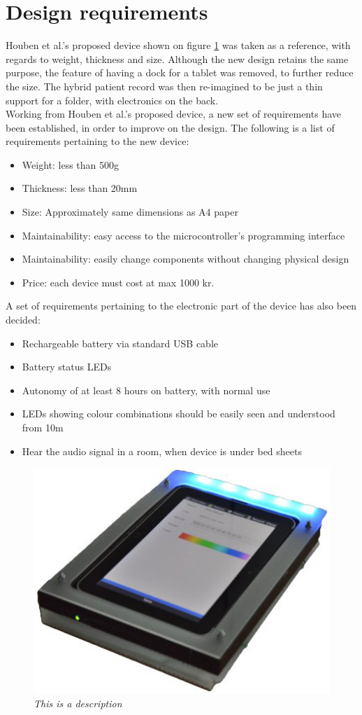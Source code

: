 \section{Design requirements}

Houben et al.'s proposed device shown on figure \ref{fig:old-hypr} was taken as a reference, with regards to weight, thickness and size. Although the new design retains the same purpose, the feature of having a dock for a tablet was removed, to further reduce the size. The hybrid patient record was then re-imagined to be just a thin support for a folder, with electronics on the back. \\

Working from Houben et al.'s proposed device, a new set of requirements have been established, in order to improve on the design. The following is a list of requirements pertaining to the new device:

\begin{itemize} \itemsep0em
	\item Weight: less than 500g
	\item Thickness: less than 20mm
	\item Size: Approximately same dimensions as A4 paper
	\item Maintainability: easy access to the microcontroller's programming interface
	\item Maintainability: easily change components without changing physical design
	\item Price: each device must cost at max 1000 kr.
\end{itemize}

A set of requirements pertaining to the electronic part of the device has also been decided:

\begin{itemize} \itemsep0em
	\item Rechargeable battery via standard USB cable
	\item Battery status LEDs
	\item Autonomy of at least 8 hours on battery, with normal use
	\item LEDs showing colour combinations should be easily seen and understood from 10m 
	\item Hear the audio signal in a room, when device is under bed sheets
\end{itemize}

\begin{figure}[h]
\begin{center}
\includegraphics[scale=.5]{figures/old-hypr.jpg}
\caption{\small {\it {This is a description}}} \label{fig:old-hypr}
\end{center}
\end{figure}